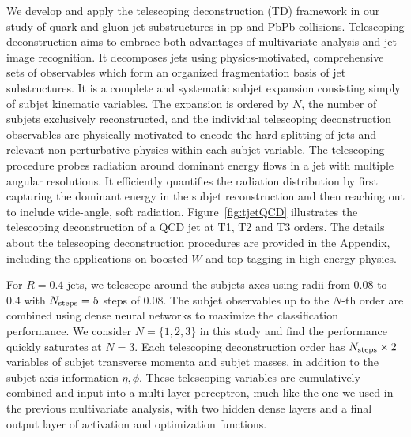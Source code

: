 \documentclass[notoc]{JHEP3}
\begin{document}
We develop and apply the telescoping deconstruction (TD) framework in our study of quark and gluon jet substructures in pp and PbPb collisions. Telescoping deconstruction aims to embrace both advantages of multivariate analysis and jet image recognition. It decomposes jets using physics-motivated, comprehensive sets of observables which form an organized fragmentation basis of jet substructures. It is a complete and systematic subjet expansion consisting simply of subjet kinematic variables. The expansion is ordered by $N$, the number of subjets exclusively reconstructed, and the individual telescoping deconstruction observables are physically motivated to encode the hard splitting of jets and relevant non-perturbative physics within each subjet variable. The telescoping procedure probes radiation around dominant energy flows in a jet with multiple angular resolutions. It efficiently quantifies the radiation distribution by first capturing the dominant energy in the subjet reconstruction and then reaching out to include wide-angle, soft radiation. Figure~\ref{fig:tjetQCD} illustrates the telescoping deconstruction of a QCD jet at T1, T2 and T3 orders. The details about the telescoping deconstruction procedures are provided in the Appendix, including the applications on boosted $W$ and top tagging in high energy physics.

For $R=0.4$ jets, we telescope around the subjets axes using radii from 0.08 to 0.4 with $N_{\rm steps} = 5$ steps of 0.08. The subjet observables up to the $N$-th order are combined using dense neural networks to maximize the classification performance. We consider $N=\{1,2,3\}$ in this study and find the performance quickly saturates at $N=3$. Each telescoping deconstruction order has $N_{\rm steps} \times 2$ variables of subjet transverse momenta and subjet masses, in addition to the subjet axis information $\eta, \phi$. %
These telescoping variables are cumulatively combined and input into a multi layer perceptron, much like the one we used in the previous multivariate analysis, with two hidden dense layers and a final output layer of activation and optimization functions.
\end{document}
